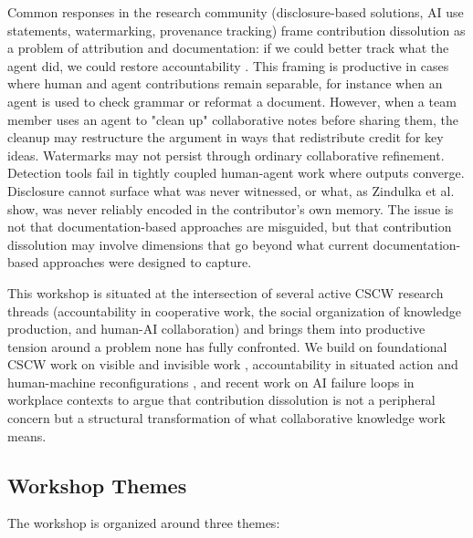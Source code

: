 \documentclass[manuscript,review]{acmart}
\begin{document}
Common responses in the research community (disclosure-based solutions, AI use statements, watermarking, provenance tracking) frame contribution dissolution as a problem of attribution and documentation: if we could better track what the agent did, we could restore accountability \cite{birnholtz2012tracking, liu2024survey, weisz2025human, he2025exploring}. This framing is productive in cases where human and agent contributions remain separable, for instance when an agent is used to check grammar or reformat a document. However, when a team member uses an agent to "clean up" collaborative notes before sharing them, the cleanup may restructure the argument in ways that redistribute credit for key ideas. Watermarks may not persist through ordinary collaborative refinement. Detection tools fail in tightly coupled human-agent work where outputs converge. Disclosure cannot surface what was never witnessed, or what, as Zindulka et al. \cite{zindulka2025ai} show, was never reliably encoded in the contributor's own memory. The issue is not that documentation-based approaches are misguided, but that contribution dissolution may involve dimensions that go beyond what current documentation-based approaches were designed to capture.

This workshop is situated at the intersection of several active CSCW research threads (accountability in cooperative work, the social organization of knowledge production, and human-AI collaboration) and brings them into productive tension around a problem none has fully confronted. We build on foundational CSCW work on visible and invisible work \cite{star1999}, accountability in situated action and human-machine reconfigurations \cite{suchman1987plans, suchman2007human}, and recent work on AI failure loops in workplace contexts \cite{kawakami2026ai, jo2025understanding} to argue that contribution dissolution is not a peripheral concern but a structural transformation of what collaborative knowledge work means.

\subsection{Workshop Themes}
The workshop is organized around three themes:
\end{document}
